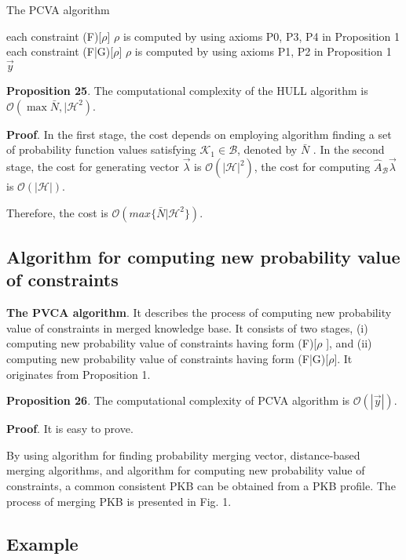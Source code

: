\documentclass[10pt,a4paper]{IOS-Book-Article}
\begin{document}
\begin{algorithm}
\caption{The PCVA algorithm}
\begin{algorithmic}[1]
\For each constraint (F)[$\rho$] 
  \State $\rho$ is computed by using axioms P0, P3, P4 in Proposition 1
\EndFor
\For each constraint (F|G)[$\rho$]
  \State $\rho$ is computed by using axioms P1, P2 in Proposition 1
\EndFor
\State \Return $\vec{y}$
\end{algorithmic}
\end{algorithm}

\textbf{Proposition 25}. The computational complexity of the
HULL algorithm is $\mathcal{O}(\max{\bar N, |\mathcal{H}^2})$.

\textbf{Proof}. In the first stage, the cost depends on employing algorithm finding a set of probability function
values satisfying $\mathcal{K}_1 \in \mathcal{B}$, denoted by $\bar N$ . In the
second stage, the cost for generating vector $\vec{\lambda}$ is
$\mathcal{O}(|\mathcal{H}|^2)$, the cost for computing $\hat{A}_\mathcal{B}\vec{\lambda}$ is $\mathcal{O}(|\mathcal{H}|)$.

Therefore, the cost is $\mathcal{O}(max\{\bar N|\mathcal{H}^2\})$.

\subsection{Algorithm for computing new probability value of constraints}

\textbf{The PVCA algorithm}. It describes the process of computing new probability value of constraints in merged knowledge base. It consists of two stages, (i) computing new probability value of constraints having form (F)[$\rho$ ], and (ii) computing new probability value of constraints having form (F|G)[$\rho$]. It originates from Proposition 1.

\textbf{Proposition 26}. The computational complexity of PCVA algorithm is $\mathcal{O}(|\vec{y} |)$.

\textbf{Proof}. It is easy to prove. 

By using algorithm for finding probability merging vector, distance-based merging algorithms, and algorithm for computing new probability value of constraints, a common consistent PKB can be obtained from a PKB profile. The process of merging PKB is presented in Fig. 1.

\subsection{Example}
\end{document}

